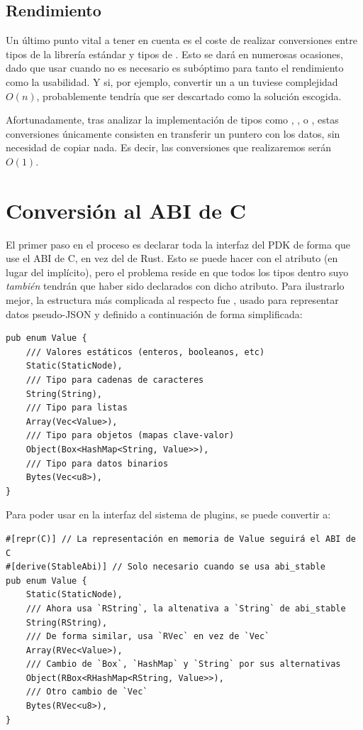 \subsection{Rendimiento}\label{abiperf}

Un último punto vital a tener en cuenta es el coste de realizar conversiones
entre tipos de la librería estándar y tipos de \abistable. Esto se dará en
numerosas ocasiones, dado que usar \abistable cuando no es necesario es
subóptimo para tanto el rendimiento como la usabilidad. Y si, por ejemplo,
convertir un  a un  tuviese complejidad $O(n)$,
probablemente \abistable tendría que ser descartado como la solución escogida.

Afortunadamente, tras analizar la implementación de tipos como ,
,  o , estas conversiones únicamente
consisten en transferir un puntero con los datos, sin necesidad de copiar nada.
Es decir, las conversiones que realizaremos serán $O(1)$.

\section{Conversión al ABI de C}

El primer paso en el proceso es declarar toda la interfaz del PDK de forma que
use el ABI de C, en vez del de Rust. Esto se puede hacer con el atributo
\code{#[repr(C)]} (en lugar del  implícito), pero el
problema reside en que todos los tipos dentro suyo \emph{también} tendrán que
haber sido declarados con dicho atributo. Para ilustrarlo mejor, la estructura
más complicada al respecto fue , usado para representar datos
pseudo-JSON y definido a continuación de forma simplificada:

\begin{verbatim}
pub enum Value {
    /// Valores estáticos (enteros, booleanos, etc)
    Static(StaticNode),
    /// Tipo para cadenas de caracteres
    String(String),
    /// Tipo para listas
    Array(Vec<Value>),
    /// Tipo para objetos (mapas clave-valor)
    Object(Box<HashMap<String, Value>>),
    /// Tipo para datos binarios
    Bytes(Vec<u8>),
}
\end{verbatim}

Para poder usar  en la interfaz del sistema de plugins, se puede
convertir a:

\begin{verbatim}
#[repr(C)] // La representación en memoria de Value seguirá el ABI de C
#[derive(StableAbi)] // Solo necesario cuando se usa abi_stable
pub enum Value {
    Static(StaticNode),
    /// Ahora usa `RString`, la altenativa a `String` de abi_stable
    String(RString),
    /// De forma similar, usa `RVec` en vez de `Vec`
    Array(RVec<Value>),
    /// Cambio de `Box`, `HashMap` y `String` por sus alternativas
    Object(RBox<RHashMap<RString, Value>>),
    /// Otro cambio de `Vec`
    Bytes(RVec<u8>),
}
\end{verbatim}

